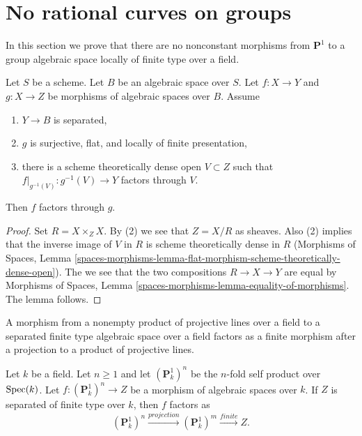 \section{No rational curves on groups}
\label{section-no-rational-curves}

\noindent
In this section we prove that there are no nonconstant morphisms
from $\mathbf{P}^1$ to a group algebraic space locally of finite
type over a field.

\begin{lemma}
\label{lemma-factor-through-over-open}
Let $S$ be a scheme. Let $B$ be an algebraic space over $S$.
Let $f : X \to Y$ and $g : X \to Z$ be morphisms of algebraic
spaces over $B$. Assume
\begin{enumerate}
\item $Y \to B$ is separated,
\item $g$ is surjective, flat, and locally of finite presentation,
\item there is a scheme theoretically dense open $V \subset Z$
such that $f|_{g^{-1}(V)} : g^{-1}(V) \to Y$ factors through $V$.
\end{enumerate}
Then $f$ factors through $g$.
\end{lemma}

\begin{proof}
Set $R = X \times_Z X$. By (2) we see that $Z = X/R$ as sheaves.
Also (2) implies that the inverse image of $V$ in $R$ is scheme
theoretically dense in $R$ (Morphisms of Spaces, Lemma
\ref{spaces-morphisms-lemma-flat-morphism-scheme-theoretically-dense-open}).
The we see that the two compositions
$R \to X \to Y$ are equal by Morphisms of Spaces, Lemma
\ref{spaces-morphisms-lemma-equality-of-morphisms}.
The lemma follows.
\end{proof}

\begin{lemma}
\label{lemma-quotient-power-P1}
\begin{slogan}
A morphism from a nonempty product of projective lines over a field to
a separated finite type algebraic space over a field factors as a
finite morphism after a projection to a product of projective lines.
\end{slogan}
Let $k$ be a field. Let $n \geq 1$ and let $(\mathbf{P}^1_k)^n$
be the $n$-fold self product over $\mathop{\mathrm{Spec}}(k)$. Let
$f : (\mathbf{P}^1_k)^n \to Z$ be a morphism of algebraic spaces over $k$.
If $Z$ is separated of finite type over $k$, then $f$ factors as
$$
(\mathbf{P}^1_k)^n \xrightarrow{projection}
(\mathbf{P}^1_k)^m \xrightarrow{finite} Z.
$$
\end{lemma}

